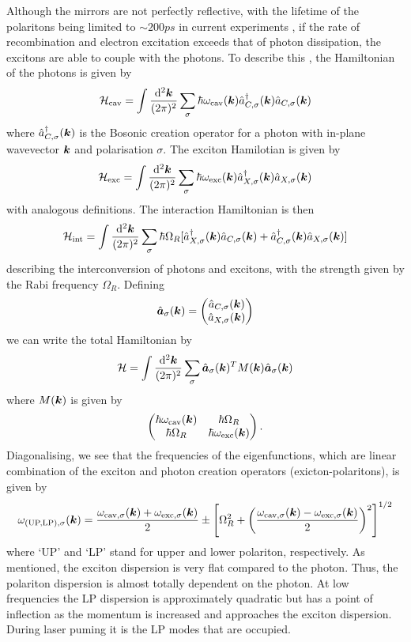 Although the mirrors are not perfectly reflective,
with the lifetime of the polaritons being limited to $\sim 200 ps$ in current experiments \cite{2014arXiv1408.1680S}, if the rate of recombination and electron excitation exceeds that of photon dissipation,
the excitons are able to couple with the photons. To describe this \cite{RevModPhys.85.299}, the Hamiltonian of the photons is given by 
\[
\mathcal{H}_{\text{cav}} = \int \frac{\dd[2]{\boldsymbol{k}}}{(2\pi)^2} \sum_\sigma 
\hbar\omega_{\text{cav}}(\boldsymbol{k})\hat{a}^\dagger_{C,\sigma}(\boldsymbol{k})\hat{a}_{C,\sigma}(\boldsymbol{k})
\]
where $\hat{a}^\dagger_{C,\sigma}(\boldsymbol{k})$ is the Bosonic creation operator for a photon with in-plane wavevector $\boldsymbol{k}$ and polarisation $\sigma.$ The exciton Hamilotian is given by 
\[
\mathcal{H}_{\text{exc}} = \int \frac{\dd[2]{\boldsymbol{k}}}{(2\pi)^2} \sum_\sigma 
\hbar\omega_{\text{exc}}(\boldsymbol{k})\hat{a}^\dagger_{X,\sigma}(\boldsymbol{k})\hat{a}_{X,\sigma}(\boldsymbol{k})
\]
with analogous definitions. The interaction Hamiltonian is then 
\[
\mathcal{H}_{\text{int}} = \int \frac{\dd[2]{\boldsymbol{k}}}{(2\pi)^2} \sum_\sigma \hbar \Omega_R [ \hat{a}^\dagger_{X,\sigma}(\boldsymbol{k})\hat{a}_{C,\sigma}(\boldsymbol{k}) + \hat{a}^\dagger_{C,\sigma}(\boldsymbol{k})\hat{a}_{X,\sigma}(\boldsymbol{k})]
\]
describing the interconversion of photons and excitons, with the strength given by the Rabi frequency $\Omega_R$. Defining 
\[
\hat{\boldsymbol{a}}_\sigma(\boldsymbol{k}) = 
\begin{pmatrix}
\hat{a}_{C, \sigma}(\boldsymbol{k}) \\
\hat{a}_{X,\sigma}(\boldsymbol{k})
\end{pmatrix}
\]
we can write the total Hamiltonian by 
\[
\mathcal{H} = \int \frac{\dd[2]{\boldsymbol{k}}}{(2\pi)^2} \sum_\sigma \hat{\boldsymbol{a}}_\sigma (\boldsymbol{k})^TM(\boldsymbol{k}) \hat{\boldsymbol{a}}_\sigma(\boldsymbol{k})
\]
where $M(\boldsymbol{k})$ is given by 
\[
\begin{pmatrix}
\hbar\omega_{\text{cav}}(\boldsymbol{k}) & \hbar \Omega_R \\
\hbar \Omega_R & \hbar\omega_{\text{exc}}(\boldsymbol{k})
\end{pmatrix}.
\]
Diagonalising, we see that the frequencies of the eigenfunctions, which are linear combination of the exciton and photon creation operators (exicton-polaritons), is given by
\[
\omega_{\text{(UP,LP)},\sigma}(\boldsymbol{k}) = \frac{\omega_{\text{cav},\sigma}(\boldsymbol{k}) + \omega_{\text{exc},\sigma}(\boldsymbol{k})}{2} \pm \left[ \Omega_R^2 + \left(\frac{\omega_{\text{cav},\sigma}(\boldsymbol{k}) - \omega_{\text{exc},\sigma}(\boldsymbol{k})}{2}\right)^2\right]^{1/2}
\]
where `UP' and `LP' stand for upper and lower polariton, respectively. As mentioned, the exciton dispersion is very flat compared to the photon. Thus, the polariton dispersion is almost totally dependent on the photon. At low frequencies the LP dispersion is approximately quadratic but has a point of inflection as the momentum is increased and approaches the exciton dispersion. During laser puming it is the LP modes that are occupied. 

